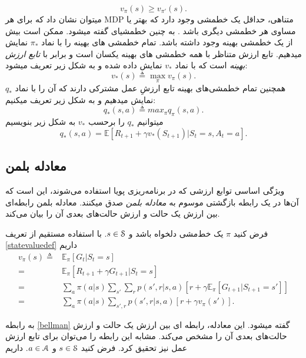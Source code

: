 $$v_\pi(s) \ge v_{\pi'}(s).$$
 می\nf توان نشان داد که برای هر MDP متناهی، حداقل یک خط\nf مشی وجود دارد که بهتر یا مساوی هر خط\nf مشی دیگری باشد
\cite{suttonbook}.
 به چنین خط\nf مشی\nf ای  گفته می\nf  شود. ممکن است بیش از یک خط\nf مشی بهینه وجود داشته باشد. تمام خط\nf مشی\nf‌ های بهینه را با نماد $\pi_*$  نمایش می\nf دهیم. تابع ارزش متناظر با همه خط\nf مشی\nf‌ های بهینه یکسان است و برابر با 
\textit{تابع ارزش بهینه}
 است که با نماد $v_*$ نمایش داده شده و به شکل زیر تعریف می\nf شود:
$$v_*(s) \triangleq \max_{\pi} v_\pi(s).$$
همچنین تمام خط\nf مشی\nf ‌های بهینه تابع ارزشِ عمل مشترکی دارند که آن را با نماد $q_*$ نمایش می\nf دهیم و به شکل زیر تعریف می\nf کنیم:
$$q_*(s,a) \triangleq max_{\pi} q_\pi(s,a).$$
می\nf توانیم $q_*$ را برحسب $v_*$ به شکل زیر بنویسیم
\begin{equation}
q_* (s,a) = \mathbb{E}[R_{t+1} + \gamma v_*(S_{t+1})| S_t=s, A_t=a].
\end{equation}

\subsection{معادله بلمن}

ویژگی اساسی توابع ارزشی که در برنامه‌ریزی پویا استفاده می‌شوند،  این است که آن‌ها در یک رابطه بازگشتی موسوم به 
\textit{معادله بلمن} 
صدق می\nf کنند. معادله بلمن رابطه‌ای بین ارزش یک حالت و ارزش‌ حالت‌های بعدی آن را بیان می‌کند.

فرض کنید $\pi$ یک خط‌مشی دلخواه باشد و
 $s \in \EuScript{S}$.
  با استفاده مستقیم از تعریف
 \ref{statevaluedef}
 داریم
\begin{align}
v_\pi (s) \triangleq& \mathbb{E}_\pi [G_t | S_t = s] \nonumber \\
=& \mathbb{E}_\pi [R_{t+1}+ \gamma G_{t+1}|S_t=s] \nonumber \\
=&\sum_{a} \pi(a|s) \sum_{s'}\sum_{r} p(s',r|s,a)[r+\gamma \mathbb{E}_\pi[G_{t+1}|S_{t+1}=s']] \nonumber\\
=&\sum_{a} \pi(a|s) \sum_{s',r} p(s',r|s,a)[r+\gamma v_\pi(s')] %
\label{bellman}.
\end{align}

به رابطه 
 \ref{bellman}
 گفته می\nf شود. این معادله، رابطه ای بین ارزش یک حالت و ارزش حالت‌های بعدی آن را مشخص می‌کند. مشابه این رابطه را می‌توان برای تابع ارزش عمل نیز تحقیق کرد. فرض کنید 
$s \in \EuScript{S}$
 و 
 $a \in \EuScript{A}$.
 داریم
 
